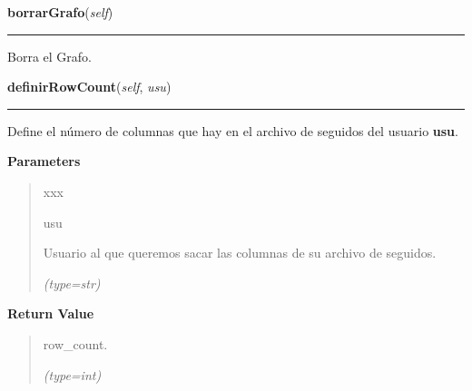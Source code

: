     \vspace{0.5ex}

\hspace{.8\funcindent}\begin{boxedminipage}{\funcwidth}

    \raggedright \textbf{borrarGrafo}(\textit{self})

    \vspace{-1.5ex}

    \rule{\textwidth}{0.5\fboxrule}
\setlength{\parskip}{2ex}
    Borra el Grafo.

\setlength{\parskip}{1ex}
    \end{boxedminipage}

    \label{grafico:Grafico:definirRowCount}

    \vspace{0.5ex}

\hspace{.8\funcindent}\begin{boxedminipage}{\funcwidth}

    \raggedright \textbf{definirRowCount}(\textit{self}, \textit{usu})

    \vspace{-1.5ex}

    \rule{\textwidth}{0.5\fboxrule}
\setlength{\parskip}{2ex}
    Define el número de columnas que hay en el archivo de seguidos del 
    usuario \textbf{usu}.

\setlength{\parskip}{1ex}
      \textbf{Parameters}
      \vspace{-1ex}

      \begin{quote}
        \begin{Ventry}{xxx}

          \item[usu]

          Usuario al que queremos sacar las columnas de su archivo de 
          seguidos.

            {\it (type=str)}

        \end{Ventry}

      \end{quote}

      \textbf{Return Value}
    \vspace{-1ex}

      \begin{quote}
      row\_count.

      {\it (type=int)}

      \end{quote}

    \end{boxedminipage}


